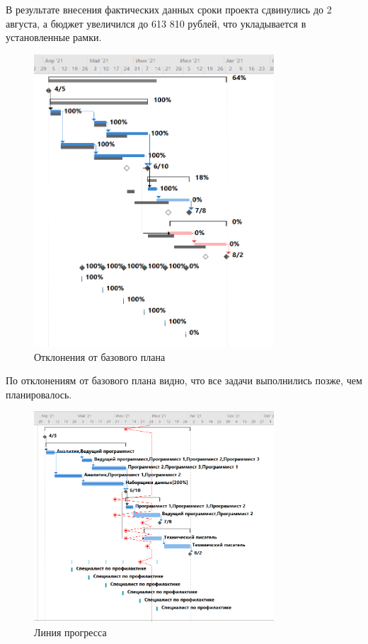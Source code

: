 В результате внесения фактических данных сроки проекта сдвинулись до 2 августа, а бюджет увеличился до 613 810 рублей, что укладывается в установленные рамки.

\begin{figure}[H]
    \centering
    \includegraphics[width=0.8\textwidth]{img/content/task_10_2.png}
    \caption{Отклонения от базового плана}
    \label{fig:task_10_2}
\end{figure}

По отклонениям от базового плана видно, что все задачи выполнились позже, чем планировалось.

\begin{figure}[H]
    \centering
    \includegraphics[width=0.8\textwidth]{img/content/task_10_3.png}
    \caption{Линия прогресса}
    \label{fig:task_10_3}
\end{figure}

